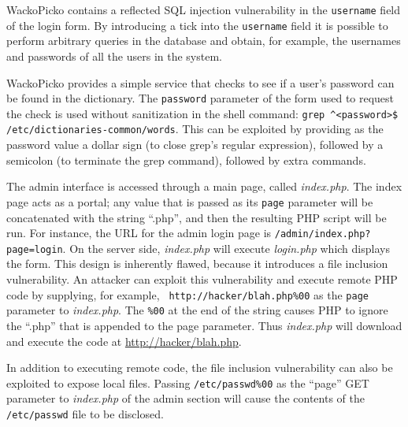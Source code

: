 WackoPicko contains a reflected SQL injection vulnerability in the {\tt user\-name}
field of the login form. By introducing a tick into
the {\tt username} field it is possible to perform arbitrary queries in the 
database and obtain, for example, the usernames and passwords of
all the users in the system.

WackoPicko provides a simple service that
checks to see if a user's password can be found in the dictionary. The 
{\tt password} parameter of the form used to request the check is used
without sanitization in the shell command: {\tt grep \verb|^|<password>\$ 
/etc/dictionaries-common/words}. This can be exploited by providing as
the password value a
dollar sign (to close grep's regular expression), followed by a semicolon (to
terminate the grep command), 
followed by extra commands.

The admin interface is accessed through a main page, called {\em index.php}.
The index page acts as a portal; any value that is passed as its
{\tt page} parameter will be concatenated with
the string ``.php'', and then
the resulting PHP script will be run. For instance, the URL for the admin login page is
{\tt /admin\-/index.php?\-page=login}. On the server side, \emph{index.php} will
execute \emph{login.php} which displays the form. This design is inherently flawed, because it
introduces a file inclusion vulnerability. An attacker can
exploit this vulnerability and execute remote PHP code by supplying, for
example,  {\tt
  http://hacker/\-blah.php\%00} as the {\tt page} parameter to \emph{index.php}.
The {\tt \%00} at the end of the string causes PHP to ignore the ``.php'' that
is appended to the page parameter. Thus \emph{index.php} will download and
execute the code at \url{http://hacker/blah.php}.

In addition to executing remote code, the file inclusion vulnerability can
also be exploited to expose local files. Passing {\tt/etc/passwd\%00} as the
``page'' GET parameter to \emph{index.php} of the admin section will cause the
contents of the {\tt/etc/passwd} file to be disclosed.

